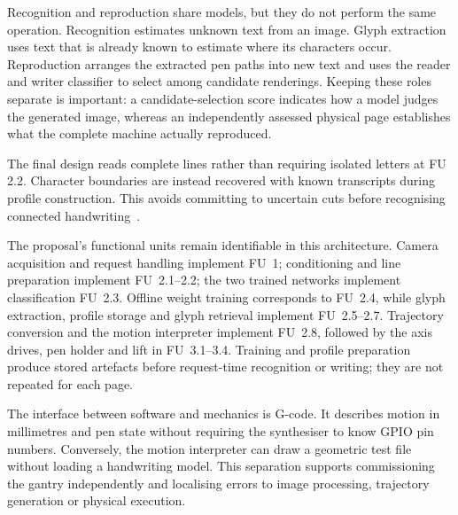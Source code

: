 Recognition and reproduction share models, but they do not perform the same operation. Recognition estimates unknown text from an image. Glyph extraction uses text that is already known to estimate where its characters occur. Reproduction arranges the extracted pen paths into new text and uses the reader and writer classifier to select among candidate renderings. Keeping these roles separate is important: a candidate-selection score indicates how a model judges the generated image, whereas an independently assessed physical page establishes what the complete machine actually reproduced.~\cite[web/server.py]{braunepipeline2026}

The final design reads complete lines rather than requiring isolated letters at FU 2.2. Character boundaries are instead recovered with known transcripts during profile construction. This avoids committing to uncertain cuts before recognising connected handwriting~\cite[recognise.py, PaperCRNNNumpy; style.py, ExtractLineGlyphs]{braunepipeline2026}.

The proposal's functional units remain identifiable in this architecture. Camera acquisition and request handling implement FU~1; conditioning and line preparation implement FU~2.1--2.2; the two trained networks implement classification FU~2.3. Offline weight training corresponds to FU~2.4, while glyph extraction, profile storage and glyph retrieval implement FU~2.5--2.7. Trajectory conversion and the motion interpreter implement FU~2.8, followed by the axis drives, pen holder and lift in FU~3.1--3.4. Training and profile preparation produce stored artefacts before request-time recognition or writing; they are not repeated for each page.~\cite[web/server.py]{braunepipeline2026}

The interface between software and mechanics is G-code. It describes motion in millimetres and pen state without requiring the synthesiser to know GPIO pin numbers. Conversely, the motion interpreter can draw a geometric test file without loading a handwriting model. This separation supports commissioning the gantry independently and localising errors to image processing, trajectory generation or physical execution.~\cite[web/server.py]{braunepipeline2026}
\FloatBarrier
